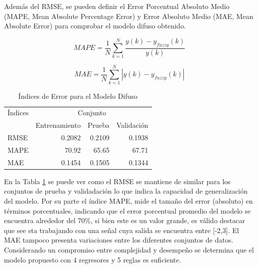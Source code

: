\documentclass[12pt]{article}
\begin{document}
\begin{itemize}
Además del RMSE, se pueden definir el Error Porcentual Absoluto Medio (MAPE, Mean Absolute Percentage Error) y Error Absoluto Medio (MAE, Mean Absolute Error) para comprobar el modelo difuso obtenido.

\begin{equation}
MAPE=\frac{1}{N}\sum_{k=1}^{N}\frac{y(k)-y_{fuzzy}(k)}{y(k)}
\label{e_MAPE}
\end{equation}

\begin{equation}
MAE=\frac{1}{N}\sum_{k=1}^{N}|y(k)-y_{fuzzy}(k)|
\label{e_MAE}
\end{equation}


\begin{table}[htbp]
  \centering
  \caption{Índices de Error para el Modelo Difuso}
    \begin{tabular}{|l|r|r|r|}
    \toprule
    Índices & \multicolumn{3}{c|}{Conjunto} \\
\cmidrule{2-4}          & \multicolumn{1}{l|}{Entrenamiento} & \multicolumn{1}{p{6em}|}{Prueba} & \multicolumn{1}{p{6.39em}|}{Validación} \\
    \midrule
    RMSE  & 0.2082 & 0.2109 & 0.1938 \\
    \midrule
    MAPE  & 70.92 & 65.65 & 67.71 \\
    \midrule
    MAE   & 0.1454 & 0.1505 & 0.1344 \\
    \bottomrule
    \end{tabular}%
  \label{t_MD}%
\end{table}%

En la Tabla \ref{t_MD} se puede ver como el RMSE se mantiene de similar para los conjuntos de prueba y validadación lo que indica la capacidad de generalización del modelo. Por su parte el índice MAPE, mide el tamaño del error (absoluto) en términos porcentuales, indicando que el error porcentual promedio del modelo se encuentra alrededor del 70\%, si bien este es un valor grande, es válido destacar que see sta trabajando con una señal cuya salida se encuentra entre [-2,3]. El MAE tampoco presenta variaciones entre los diferentes conjuntos de datos. Considerando un compromiso entre complejidad y desempeño se determina que el modelo propuesto con 4 regresores y 5 reglas es suficiente.


\end{itemize}
\end{document}
